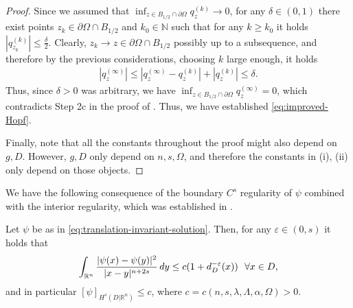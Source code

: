 \documentclass[11pt,reqno]{amsart}
\theoremstyle{plain}
\theoremstyle{definition}
\numberwithin{equation}{section}
\newcommand{\N}{\mathbb{N}}
\newcommand{\R}{\mathbb{R}}
\newcommand{\eps}{\varepsilon}
\newcommand{\1}{\mathbbm{1}}
\renewcommand{\d}{\textnormal{\,d}}
\begin{document}
\begin{proof}
Since we assumed that $\inf_{z \in B_{1/2} \cap \partial \Omega} q^{(k)}_z \to 0$, for any $\delta \in (0,1)$ there exist points $z_k \in \partial \Omega \cap B_{1/2}$ and $k_0 \in \N$ such that for any $k \ge k_0$ it holds $|q_{z_k}^{(k)}| \le \frac{\delta}{2}$. Clearly, $z_k \to z \in \partial \Omega \cap B_{1/2}$ possibly up to a subsequence, and therefore by the previous considerations, choosing $k$ large enough, it holds
\begin{align*}
|q_z^{(\infty)}| \le |q_z^{(\infty)} - q_z^{(k)}| + |q_z^{(k)}| \le \delta.
\end{align*}
Thus, since $\delta > 0$  was arbitrary, we have $\inf_{z \in B_{1/2} \cap \partial \Omega} q_z^{(\infty)} = 0$, which contradicts Step 2c in the proof of \cite[Theorem~6.10]{RoWe24}. Thus, we have established \eqref{eq:improved-Hopf}.

Finally, note that all the constants throughout the proof might also depend on $g,D$. However, $g,D$ only depend on $n,s,\Omega$, and therefore the constants in (i), (ii) only depend on those objects.
\end{proof}




We have the following consequence of the boundary $C^s$ regularity of $\psi$ combined with the interior regularity, which was established in \cite{FeRo24}.

\begin{lemma}
\label{lemma:psi-interior-reg}
Let $\psi$ be as in \eqref{eq:translation-invariant-solution}. Then, for any $\eps \in (0, s)$ it holds that
\begin{align}
\label{eq:psi-cdc}
\int_{\R^n} \frac{|\psi(x) - \psi(y)|^2}{|x-y|^{n+2s}} \d y \le c (1 + d_{D}^{-\eps}(x)) ~~ \forall x \in D,
\end{align}
and in particular $[\psi]_{H^s(D | \R^n)} \le c$, where $c=c(n,s,\lambda,\Lambda,\alpha,\Omega) > 0$.
\end{lemma}
\end{document}
